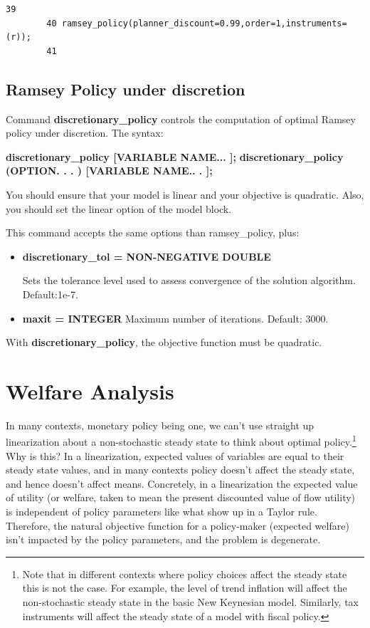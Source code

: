 \documentclass[10pt,math=newtx,citestyle=gb7714-2015,bibstyle=gb7714-2015]{elegantbook}
\begin{document}
{	\begin{lstlisting}[frame=shadowbox]
		39
		40 ramsey_policy(planner_discount=0.99,order=1,instruments=(r));
		41
	\end{lstlisting}
	
	\subsection{Ramsey Policy under discretion}
	
	Command \textbf{discretionary\_policy} controls the computation of optimal Ramsey policy under discretion. The syntax:
	
	\textbf{discretionary\_policy [VARIABLE NAME... ];}
	\textbf{discretionary\_policy (OPTION. . . ) [VARIABLE NAME.. . ];}
	
	You should ensure that your model is linear and your objective is quadratic. Also, you should set the linear option of the model block.
	
	This command accepts the same options than ramsey\_policy, plus:
	
	\begin{itemize}
		\item \textbf{discretionary\_tol = NON-NEGATIVE DOUBLE} 
		
		Sets the tolerance level used to assess convergence of the solution algorithm. Default:1e-7.
		
		\item \textbf{maxit = INTEGER} Maximum number of iterations. Default: 3000.
	\end{itemize}
	
	With \textbf{discretionary\_policy}, the objective function must be quadratic.
	
	\section{Welfare Analysis}
	
	In many contexts, monetary policy being one, we can't use straight up linearization about a non-stochastic steady state to think about optimal policy.\footnote{Note that in different contexts where policy choices affect the steady state this is not the case. For example, the level of trend inflation will affect the non-stochastic steady state in the basic New Keynesian model. Similarly, tax instruments will affect the steady state of a model with fiscal policy.} Why is this? In a linearization, expected values of variables are equal to their steady state values, and in many contexts policy doesn't affect
	the steady state, and hence doesn't affect means. Concretely, in a linearization the expected value of utility (or welfare, taken to mean the present discounted value of flow utility) is independent of policy parameters like what show up in a Taylor rule. Therefore, the natural objective function for a policy-maker (expected welfare) isn't impacted by the policy parameters, and the problem is degenerate.
	
}
\end{document}
